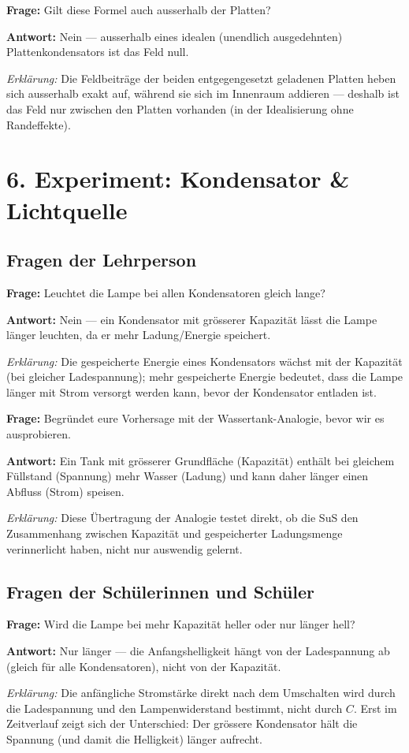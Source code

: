 \documentclass[11pt,a4paper]{article}
\newcommand{\Frage}[1]{\textbf{Frage:} #1\par}
\newcommand{\Antwort}[1]{\textbf{Antwort:} #1\par}
\newcommand{\Erklaerung}[1]{\textit{Erklärung:} #1}
\newcommand{\FrageBlock}[3]{\Frage{#1}\Antwort{#2}\Erklaerung{#3}\vspace{0.6em}}
\begin{document}
\FrageBlock{Gilt diese Formel auch ausserhalb der Platten?}
{Nein --- ausserhalb eines idealen (unendlich ausgedehnten) Plattenkondensators ist das Feld null.}
{Die Feldbeiträge der beiden entgegengesetzt geladenen Platten heben sich ausserhalb exakt auf, während sie sich im Innenraum addieren --- deshalb ist das Feld nur zwischen den Platten vorhanden (in der Idealisierung ohne Randeffekte).}

\section*{6. Experiment: Kondensator \& Lichtquelle}

\subsection*{Fragen der Lehrperson}

\FrageBlock{Leuchtet die Lampe bei allen Kondensatoren gleich lange?}
{Nein --- ein Kondensator mit grösserer Kapazität lässt die Lampe länger leuchten, da er mehr Ladung/Energie speichert.}
{Die gespeicherte Energie eines Kondensators wächst mit der Kapazität (bei gleicher Ladespannung); mehr gespeicherte Energie bedeutet, dass die Lampe länger mit Strom versorgt werden kann, bevor der Kondensator entladen ist.}

\FrageBlock{Begründet eure Vorhersage mit der Wassertank-Analogie, bevor wir es ausprobieren.}
{Ein Tank mit grösserer Grundfläche (Kapazität) enthält bei gleichem Füllstand (Spannung) mehr Wasser (Ladung) und kann daher länger einen Abfluss (Strom) speisen.}
{Diese Übertragung der Analogie testet direkt, ob die SuS den Zusammenhang zwischen Kapazität und gespeicherter Ladungsmenge verinnerlicht haben, nicht nur auswendig gelernt.}

\subsection*{Fragen der Schülerinnen und Schüler}

\FrageBlock{Wird die Lampe bei mehr Kapazität heller oder nur länger hell?}
{Nur länger --- die Anfangshelligkeit hängt von der Ladespannung ab (gleich für alle Kondensatoren), nicht von der Kapazität.}
{Die anfängliche Stromstärke direkt nach dem Umschalten wird durch die Ladespannung und den Lampenwiderstand bestimmt, nicht durch $C$. Erst im Zeitverlauf zeigt sich der Unterschied: Der grössere Kondensator hält die Spannung (und damit die Helligkeit) länger aufrecht.}
\end{document}
